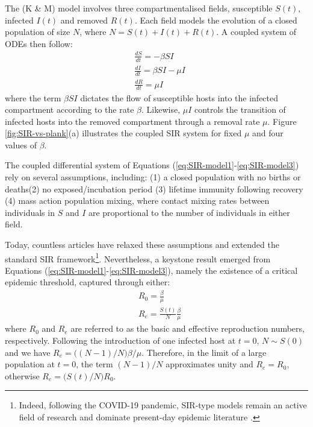 The \cite{kermack-model} (K \& M) model involves three compartmentalised fields, 
susceptible $S(t)$, infected $I(t)$ and removed $R(t)$.
Each field models the evolution of a closed population of size $N$, where $N = S(t) + I(t) + R(t)$. 
A coupled system of ODEs then follow:
\begin{align}
\label{eq:SIR-model1}
    &\frac{dS}{dt} = -\beta SI \\
    &\frac{dI}{dt} = \beta SI - \mu I \\
    \label{eq:SIR-model3}
    &\frac{dR}{dt} = \mu I
\end{align}
where the term $\beta S I$ dictates the flow of susceptible hosts into the infected compartment according 
to the rate $\beta$. Likewise, $\mu I$ controls the transition of infected hosts into the removed compartment
through a removal rate $\mu$. Figure \ref{fig:SIR-vs-plank}(a) illustrates the coupled SIR system for 
fixed $\mu$ and four values of $\beta$.

The coupled differential system of Equations (\ref{eq:SIR-model1}-\ref{eq:SIR-model3}) rely on several assumptions, including:
(1) a closed population with no births or deaths(2) no exposed/incubation period (3) lifetime immunity following recovery
(4) mass action population mixing, where contact mixing rates between individuals in $S$ and $I$ are proportional 
to the number of individuals in either field.

Today, countless articles have relaxed these assumptions and extended the standard SIR framework\footnote{
Indeed, following the COVID-19 pandemic, SIR-type models remain an active field of research 
and dominate present-day epidemic literature \cite{atkeson2020using}.}.
Nevertheless, a keystone result emerged from Equations (\ref{eq:SIR-model1}-\ref{eq:SIR-model3}), namely 
the existence of a critical epidemic threshold, captured through either:
\begin{align}
    \label{eq:R0-SIR}
    & R_0 = \frac{\beta}{\mu}\\
    \label{eq:R0-effective}
    & R_e = \frac{S(t)}{N} \frac{\beta}{\mu}
\end{align}
where $R_0$ and $R_e$ are referred to as the basic and effective reproduction numbers, respectively.
Following the introduction of one infected host at $t=0$, $N\sim S(0)$ and 
we have $R_e=\big((N-1)/N\big) \beta / \mu$. Therefore, in the limit of a large population at $t=0$, the term
$(N-1)/N$ approximates unity and $R_e = R_0$, otherwise $R_e=\big(S(t)/N\big) R_0$.

